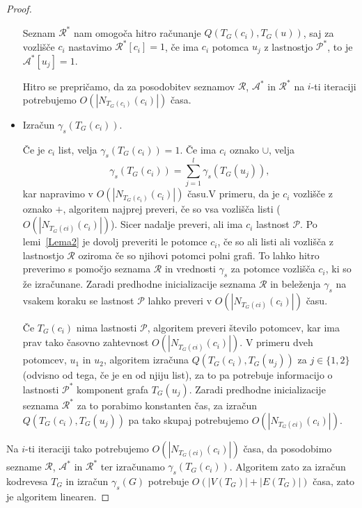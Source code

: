 \documentclass[12pt,a4paper,twoside]{article}
\theoremstyle{definition} %
\theoremstyle{plain} %
\numberwithin{equation}{section}  %
\begin{document}
\begin{proof}
\begin{itemize}
Seznam $\mathcal{R^*}$ nam omogoča hitro računanje $Q(T_G(c_i), T_G(u))$, saj za vozlišče $c_i$ nastavimo $\mathcal{R^*}[c_i] = 1$, če ima $c_i$ potomca $u_j$ z lastnostjo $\mathcal{P^*}$, to je $\mathcal{A^*}[u_j] = 1$.

Hitro se prepričamo, da za posodobitev seznamov $\mathcal{R}$, $\mathcal{A^*}$ in $\mathcal{R^*}$ na $i$-ti iteraciji potrebujemo $O(|N_{T_G(c_i)}(c_i)|)$ časa.

\item Izračun $\gamma_s(T_G(c_i))$.

Če je $c_i$ list, velja $\gamma_s(T_G(c_i)) = 1$. Če ima $c_i$ oznako $\cup$, velja $$\gamma_s(T_G(c_i)) = \sum\limits_{j=1}^l \gamma_s(T_G(u_j)),$$ kar napravimo v $O(|N_{T_G(c_i)}(c_i)|)$ času.V primeru, da je $c_i$ vozlišče z oznako $+$, algoritem najprej preveri, če so vsa vozlišča listi ($O(|N_{T_G(ci)}(c_i)|)$). Sicer nadalje preveri, ali ima $c_i$ lastnost $\mathcal{P}$. Po lemi~\ref{Lema2} je dovolj preveriti le potomce $c_i$, če so ali listi ali vozlišča z lastnostjo $\mathcal{R}$ oziroma če so njihovi potomci polni grafi. To lahko hitro preverimo s pomočjo seznama $\mathcal{R}$ in vrednosti $\gamma_s$ za potomce vozlišča $c_i$, ki so že izračunane. Zaradi predhodne inicializacije seznama $\mathcal{R}$ in beleženja $\gamma_s$ na vsakem koraku se lastnost $\mathcal{P}$ lahko preveri v $O(|N_{T_G(ci)}(c_i)|)$ času.

Če $T_G(c_i)$ nima lastnosti $\mathcal{P}$, algoritem preveri število potomcev, kar ima prav tako časovno zahtevnost $O(|N_{T_G(ci)}(c_i)|)$. V primeru dveh potomcev, $u_1$ in $u_2$, algoritem izračuna $Q(T_G(c_i), T_G(u_j))$ za $j \in \{1, 2\}$ (odvisno od tega, če je en od njiju list), za to pa potrebuje informacijo o lastnosti $\mathcal{P^*}$ komponent grafa $T_G(u_j)$. Zaradi predhodne inicializacije seznama $\mathcal{R^*}$ za to porabimo konstanten čas, za izračun $Q(T_G(c_i), T_G(u_j))$ pa tako skupaj potrebujemo  $O(|N_{T_G(ci)}(c_i)|)$. 
\end{itemize}
Na $i$-ti iteraciji tako potrebujemo $O(|N_{T_G(ci)}(c_i)|)$ časa, da posodobimo sezname $\mathcal{R}$, $\mathcal{A^*}$ in $\mathcal{R^*}$ ter izračunamo $\gamma_s(T_G(c_i))$. Algoritem zato za izračun kodrevesa $T_G$ in izračun $\gamma_s(G)$  potrebuje $O(|V(T_G)| + |E(T_G)|)$ časa, zato je algoritem linearen.
\end{proof}
\end{document}
